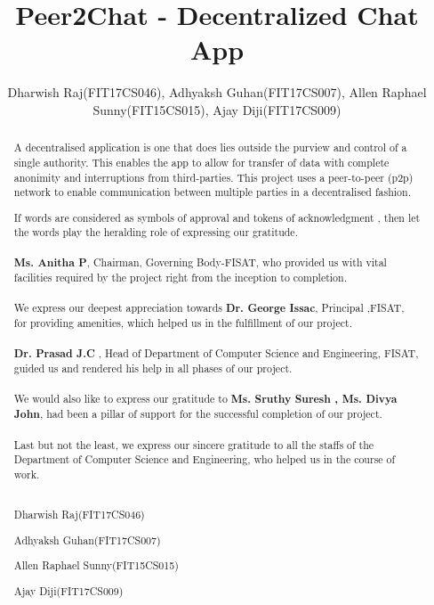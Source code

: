 \documentclass{fisatproject}
\title{Peer2Chat - Decentralized Chat App }
\author{Dharwish Raj(FIT17CS046), Adhyaksh Guhan(FIT17CS007), Allen Raphael Sunny(FIT15CS015), Ajay Diji(FIT17CS009)}
\begin{document}
\maketitle

\makecert

\newpage
\setcounter{page}{1}
\renewcommand\abstractname{ABSTRACT}
\begin{abstract}
\vspace{5cm}
A decentralised application is one that does lies outside the purview and control of a single authority. This enables the app to allow for transfer of data with complete anonimity and interruptions from third-parties. This project uses a peer-to-peer (p2p) network to enable communication between multiple parties in a decentralised fashion.
\end{abstract}


\newpage
\renewcommand\abstractname{ACKNOWLEDGMENT}
\begin{abstract}
\vspace{5cm}
If words are considered as symbols of approval and tokens of acknowledgment , then let the words play the heralding role of expressing our gratitude. \\ \\
 \textbf{Ms. Anitha P}, Chairman, Governing Body-FISAT, who provided us with vital facilities required by the project right from the inception to completion. \\ \\
 We express our deepest appreciation towards \textbf{Dr. George Issac}, Principal ,FISAT, for providing amenities, which helped us in the fulfillment of our project. \\ \\
 \textbf{Dr. Prasad J.C} , Head of Department of Computer Science and Engineering, FISAT, guided us  and rendered his help in all phases of our project. \\ \\
 We would also like to express our gratitude to \textbf{Ms. Sruthy Suresh , Ms. Divya John}, had been a pillar of support for the successful completion of our project. \\ \\
 Last but not the least, we express our sincere gratitude to all the staffs of the Department of Computer Science  and Engineering, who helped us in the course of work. \\ \\

\vspace{1cm}
\begin{flushright}
Dharwish Raj(FIT17CS046)

Adhyaksh Guhan(FIT17CS007)

Allen Raphael Sunny(FIT15CS015)

Ajay Diji(FIT17CS009)
\end{flushright}
\end{abstract}
\newpage
\end{document}

